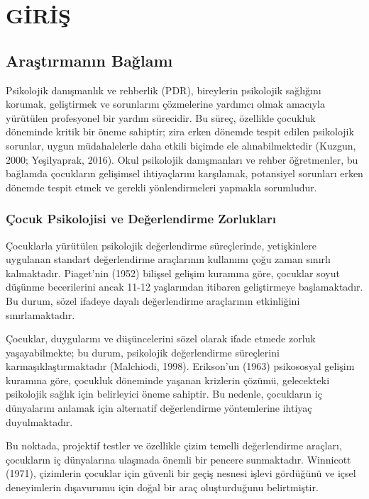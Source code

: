 
\chapter{GİRİŞ}

\section{Araştırmanın Bağlamı}

Psikolojik danışmanlık ve rehberlik (PDR), bireylerin psikolojik sağlığını korumak, geliştirmek ve sorunlarını çözmelerine yardımcı olmak amacıyla yürütülen profesyonel bir yardım sürecidir. Bu süreç, özellikle çocukluk döneminde kritik bir öneme sahiptir; zira erken dönemde tespit edilen psikolojik sorunlar, uygun müdahalelerle daha etkili biçimde ele alınabilmektedir (Kuzgun, 2000; Yeşilyaprak, 2016). Okul psikolojik danışmanları ve rehber öğretmenler, bu bağlamda çocukların gelişimsel ihtiyaçlarını karşılamak, potansiyel sorunları erken dönemde tespit etmek ve gerekli yönlendirmeleri yapmakla sorumludur.

\subsection{Çocuk Psikolojisi ve Değerlendirme Zorlukları}

Çocuklarla yürütülen psikolojik değerlendirme süreçlerinde, yetişkinlere uygulanan standart değerlendirme araçlarının kullanımı çoğu zaman sınırlı kalmaktadır. Piaget'nin (1952) bilişsel gelişim kuramına göre, çocuklar soyut düşünme becerilerini ancak 11-12 yaşlarından itibaren geliştirmeye başlamaktadır. Bu durum, sözel ifadeye dayalı değerlendirme araçlarının etkinliğini sınırlamaktadır.

Çocuklar, duygularını ve düşüncelerini sözel olarak ifade etmede zorluk yaşayabilmekte; bu durum, psikolojik değerlendirme süreçlerini karmaşıklaştırmaktadır (Malchiodi, 1998). Erikson'un (1963) psikososyal gelişim kuramına göre, çocukluk döneminde yaşanan krizlerin çözümü, gelecekteki psikolojik sağlık için belirleyici öneme sahiptir. Bu nedenle, çocukların iç dünyalarını anlamak için alternatif değerlendirme yöntemlerine ihtiyaç duyulmaktadır.

Bu noktada, projektif testler ve özellikle çizim temelli değerlendirme araçları, çocukların iç dünyalarına ulaşmada önemli bir pencere sunmaktadır. Winnicott (1971), çizimlerin çocuklar için güvenli bir geçiş nesnesi işlevi gördüğünü ve içsel deneyimlerin dışavurumu için doğal bir araç oluşturduğunu belirtmiştir.

